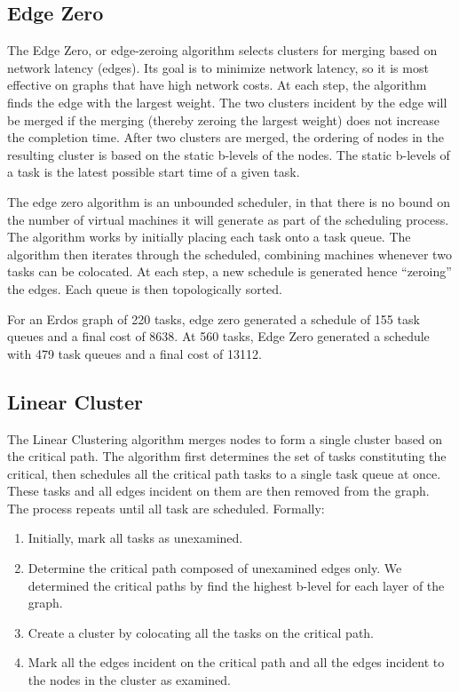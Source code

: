 \documentclass[11pt, oneside]{article}   	%
\begin{document}
\subsection{Edge Zero}

The Edge Zero, or edge-zeroing algorithm selects clusters for merging based on network latency (edges). Its goal is to minimize network latency, so it is most effective on graphs that have high network costs. At each step, the algorithm finds the edge with the largest weight. The two clusters incident by the edge will be merged if the merging (thereby zeroing the largest weight) does not increase the completion time. After two clusters are merged, the ordering of nodes in the resulting cluster is based on the static b-levels of the nodes. The static b-levels of a task is the latest possible start time of a given task.

The edge zero algorithm is an unbounded scheduler, in that there is no bound on the number of virtual machines it will generate as part of the scheduling process. The algorithm works by initially placing each task onto a task queue. The algorithm then iterates through the scheduled, combining machines whenever two tasks can be colocated. At each step, a new schedule is generated hence ``zeroing'' the edges. Each queue is then topologically sorted.

For an Erdos graph of 220 tasks, edge zero generated a schedule of 155 task queues and a final cost of 8638. At 560 tasks, Edge Zero generated a schedule with 479 task queues and a final cost of 13112.

\subsection{Linear Cluster}

The Linear Clustering algorithm merges nodes to form a single cluster based on the critical path. The algorithm first determines the set of tasks constituting the critical, then schedules all the critical path tasks to a single task queue at once. These tasks and all edges incident on them are then removed from the graph. The process repeats until all task are scheduled. Formally:

\begin{enumerate}
\item Initially, mark all tasks as unexamined.
\item Determine the critical path composed of unexamined edges only. We determined the critical paths by find the highest b-level for each layer of the graph.
\item Create a cluster by colocating all the tasks on the critical path.
\item Mark all the edges incident on the critical path and all the edges incident to the
nodes in the cluster as examined.
\end{enumerate}
\end{document}
